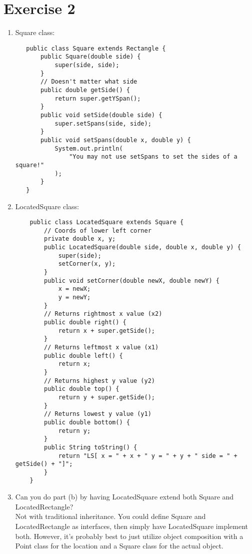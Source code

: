 \documentclass[12pt]{article}
\begin{document}
\section{Exercise 2}
\begin{enumerate}[label=(\alph*)]
\item Square class:
  \begin{verbatim}
   public class Square extends Rectangle {
       public Square(double side) {
           super(side, side);
       }
       // Doesn't matter what side
       public double getSide() {
           return super.getYSpan();
       }
       public void setSide(double side) {
           super.setSpans(side, side);
       }
       public void setSpans(double x, double y) {
           System.out.println(
               "You may not use setSpans to set the sides of a square!"
           );
       }
   }
  \end{verbatim}
\item LocatedSquare class:
  \begin{verbatim}
    public class LocatedSquare extends Square {
        // Coords of lower left corner
        private double x, y;
        public LocatedSquare(double side, double x, double y) {
            super(side);
            setCorner(x, y);
        }
        public void setCorner(double newX, double newY) {
            x = newX;
            y = newY;
        }
        // Returns rightmost x value (x2)
        public double right() {
            return x + super.getSide();
        }
        // Returns leftmost x value (x1)
        public double left() {
            return x;
        }
        // Returns highest y value (y2)
        public double top() {
            return y + super.getSide();
        }
        // Returns lowest y value (y1)
        public double bottom() {
            return y;
        }
        public String toString() {
            return "LS[ x = " + x + " y = " + y + " side = " + getSide() + "]";
        }
    }
    \end{verbatim}
  \item Can you do part (b) by having LocatedSquare extend both
Square and LocatedRectangle? \\
Not with traditional inheritance. You could define Square and LocatedRectangle
as interfaces, then simply have LocatedSquare implement both. However, it's
probably best to just utilize object composition with a Point class for the
location and a Square class for the actual object.
\end{enumerate}
\end{document}
